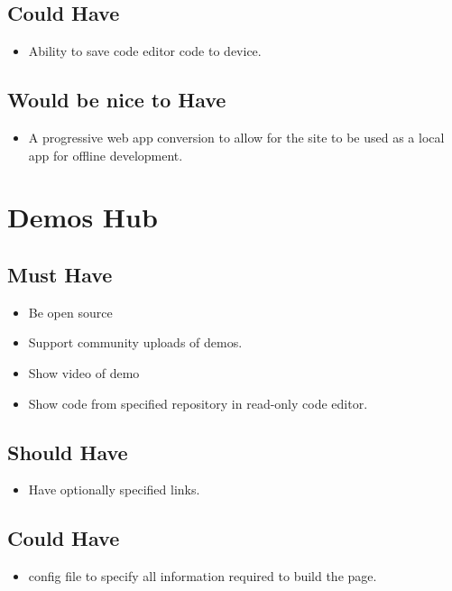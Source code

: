 \documentclass{l4proj}
\begin{document}
\begin{appendices}
\begin{itemize}
\end{itemize}
\subsection{Could Have}
\begin{itemize}
    \item Ability to save code editor code to device.
\end{itemize}
\subsection{Would be nice to Have}
\begin{itemize}
    \item A progressive web app conversion to allow for the site to be used as a local app for offline development.
\end{itemize}


\section{Demos Hub}
\subsection{Must Have}
\begin{itemize}
    \item Be open source
    \item Support community uploads of demos.
    \item Show video of demo
    \item Show code from specified repository in read-only code editor.

\end{itemize}
\subsection{Should Have}
\begin{itemize}
    \item Have optionally specified links.
\end{itemize}
\subsection{Could Have}
\begin{itemize}
    \item config file to specify all information required to build the page.
\end{itemize}

\end{appendices}
\end{document}
